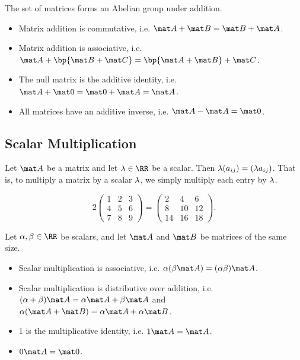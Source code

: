 \begin{fact}
    The set of matrices forms an Abelian group under addition.
    \begin{itemize}
        \item Matrix addition is commutative, i.e. $\mat A + \mat B = \mat B + \mat A$.
        \item Matrix addition is associative, i.e. $\mat A + \bp{\mat B + \mat C} = \bp{\mat A + \mat B} + \mat C$.
        \item The null matrix is the additive identity, i.e. $\mat A + \mat 0 = \mat 0 + \mat A = \mat A$.
        \item All matrices have an additive inverse, i.e. $\mat A - \mat A = \mat 0$.
    \end{itemize}
\end{fact}

\subsection{Scalar Multiplication}

\begin{definition}
    Let $\mat A$ be a matrix and let $\l \in \RR$ be a scalar. Then $\lambda (a_{ij}) = (\lambda a_{ij})$. That is, to multiply a matrix by a scalar $\lambda$, we simply multiply each entry by $\lambda$.
\end{definition}

\begin{example}
    \[2 \begin{pmatrix}1 & 2 & 3 \\ 4 & 5 & 6 \\ 7 & 8 & 9\end{pmatrix} = \begin{pmatrix}2 & 4 & 6 \\ 8 & 10 & 12 \\ 14 & 16 & 18\end{pmatrix}.\]
\end{example}

\begin{fact}
    Let $\a, \b \in \RR$ be scalars, and let $\mat A$ and $\mat B$ be matrices of the same size.
    \begin{itemize}
        \item Scalar multiplication is associative, i.e. $\a (\b \mat A) = (\a \b) \mat A$.
        \item Scalar multiplication is distributive over addition, i.e. $(\a + \b) \mat A = \a \mat A + \b \mat A$ and $\a (\mat A + \mat B) = \a \mat A + \a \mat B$.
        \item 1 is the multiplicative identity, i.e. $1 \mat A = \mat A$.
        \item $0 \mat A = \mat 0$.
    \end{itemize}
\end{fact}

